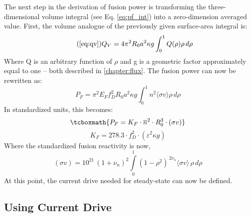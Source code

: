  The next step in the derivation of fusion power is transforming the three-dimensional volume integral (see Eq. \ref{eq:pf_int}) into a zero-dimension averaged value. First, the volume analogue of the previously given surface-area integral is:
 \begin{equation}
  	\tag{\ref{eq:qv}}
 	Q_V = 4 \pi^2 R_0 a^2 \kappa g \int_0^1 Q(\rho) \rho \, d\rho
 \end{equation}
 Where Q is an arbitrary function of $\rho$ and g is a geometric factor approximately equal to one -- both described in \cref{chapter:flux}. The fusion power can now be rewritten as:
 \begin{equation}
 	P_F = \pi^2 E_F f_D^2 R_0 a^2 \kappa g \int_0^1 n^2 \langle \sigma v \rangle \rho \, d\rho
 \end{equation}
In standardized units, this becomes:
\begin{equation}
	\label{eq:pf}
	\tcboxmath{
	P_F = K_F \cdot \overline{n}^2 \cdot R_0^3  \cdot (\sigma v)
	}
\end{equation}
\begin{equation}
  K_F = 278.3 \cdot f_D^2 \cdot ( \varepsilon^2 \kappa g )
\end{equation}
Where the standardized fusion reactivity is now,
\begin{equation}
   (\sigma v) = 10^{21} \, (1+\nu_n)^2 \int\limits_0^1 ( 1 - \rho^2 ) ^ { \, 2 \nu_n} \langle \sigma v \rangle \, \rho \, d\rho
\end{equation}
At this point, the current drive needed for steady-state can now be defined.

\subsection{Using Current Drive}

